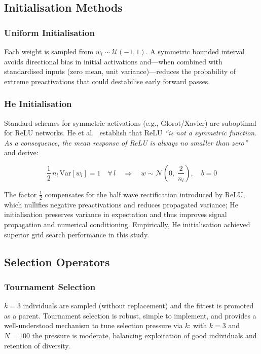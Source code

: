 \documentclass[12pt, a4paper]{article}
\begin{document}
\subsection{Initialisation Methods}

\subsubsection{Uniform Initialisation}
Each weight is sampled from $w_i \sim \mathcal{U}(-1,1)$. A symmetric bounded interval avoids directional bias in initial activations and—when combined with standardised inputs (zero mean, unit variance)—reduces the probability of extreme preactivations that could destabilise early forward passes.

\subsubsection{He Initialisation}
Standard schemes for symmetric activations (e.g., Glorot/Xavier) are suboptimal for ReLU networks. He et al.\ \cite{he2015} establish that ReLU \textit{``is not a symmetric function. As a consequence, the mean response of ReLU is always no smaller than zero''} and derive:

\begin{infobox}[title=He Initialisation Condition \cite{he2015}]
\[
\frac{1}{2}\,n_l\,\mathrm{Var}[w_l] = 1 \quad \forall\,l
\quad \Longrightarrow \quad
w \sim \mathcal{N}\!\left(0,\;\frac{2}{n_l}\right), \quad b = 0
\]
\end{infobox}

The factor $\tfrac{1}{2}$ compensates for the half wave rectification introduced by ReLU, which nullifies negative preactivations and reduces propagated variance; He initialisation preserves variance in expectation and thus improves signal propagation and numerical conditioning. Empirically, He initialisation achieved superior grid search performance in this study.

\subsection{Selection Operators}

\subsubsection{Tournament Selection}
$k=3$ individuals are sampled (without replacement) and the fittest is promoted as a parent. Tournament selection is robust, simple to implement, and provides a well-understood mechanism to tune selection pressure via $k$: with $k=3$ and $N=100$ the pressure is moderate, balancing exploitation of good individuals and retention of diversity.
\end{document}
